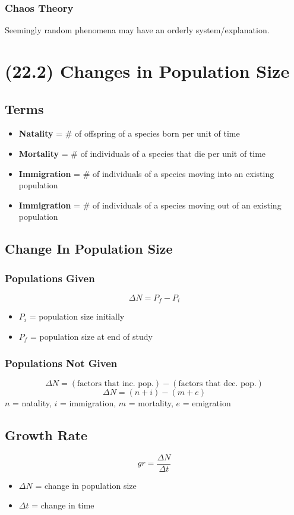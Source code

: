 \documentclass[a4paper,12pt]{article}
\begin{document}
\subsubsection{Chaos Theory}
Seemingly random phenomena may have an orderly system/explanation.

\section{(22.2) Changes in Population Size}
\subsection{Terms}
\begin{itemize}
    \item{\textbf{Natality} = \# of offspring of a species born per unit of time}
    \item{\textbf{Mortality} = \# of individuals of a species that die per unit of time}
    \item{\textbf{Immigration} = \# of individuals of a species moving into an existing population}
    \item{\textbf{Immigration} = \# of individuals of a species moving out of an existing population}
\end{itemize}

\subsection{Change In Population Size}
\subsubsection{Populations Given}
\Huge $$\Delta{N} = P_f - P_i$$ \normalsize
\begin{itemize}
    \item{$P_i$ = population size initially}
    \item{$P_f$ = population size at end of study}
\end{itemize}

\subsubsection{Populations Not Given}
$$\Delta{N} = (\textrm{factors that inc. pop.}) - (\textrm{factors that dec. pop.})$$
\Huge $$\Delta{N} = (n + i) - (m + e)$$ \normalsize
$n$ = natality, $i$ = immigration, $m$ = mortality, $e$ = emigration

\subsection{Growth Rate}
\Huge $$gr = \frac{\Delta{N}}{\Delta{t}}$$ \normalsize
\begin{itemize}
    \item{$\Delta{N}$ = change in population size}
    \item{$\Delta{t}$ = change in time}
\end{itemize}
\end{document}
